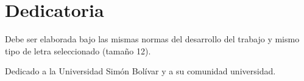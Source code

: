 \chapter*{Dedicatoria}

Debe ser elaborada bajo las mismas normas del desarrollo del trabajo y mismo tipo de letra seleccionado (tama\~no 12).

\par Dedicado a la Universidad Sim\'on Bol\'ivar y a su comunidad universidad.

